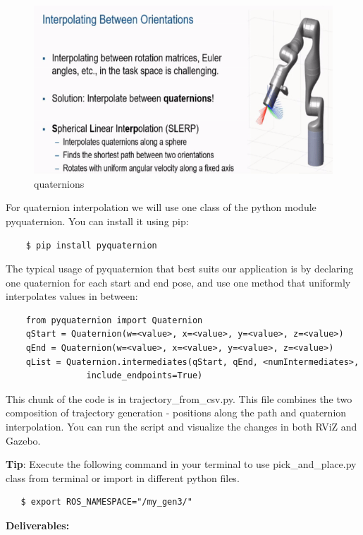 \documentclass[12pt]{article}
\begin{document}
\begin{figure}[H]
    \centering\includegraphics[width=12cm]{images/lab72.png}\vspace{-10pt}
    \caption{quaternions}\label{fig:curves}
    \end{figure}

For quaternion interpolation we will use one class of the python module pyquaternion. You can install it using pip:
\begin{verbatim}
    $ pip install pyquaternion
\end{verbatim}

The typical usage of pyquaternion that best suits our application is by declaring one quaternion for each start and end pose, and use one method that uniformly interpolates values in between:
\begin{verbatim}
    from pyquaternion import Quaternion
    qStart = Quaternion(w=<value>, x=<value>, y=<value>, z=<value>)
    qEnd = Quaternion(w=<value>, x=<value>, y=<value>, z=<value>)
    qList = Quaternion.intermediates(qStart, qEnd, <numIntermediates>, 
                include_endpoints=True)
\end{verbatim}

This chunk of the code is in trajectory\_from\_csv.py. This file combines the two composition of trajectory generation - positions along the path and quaternion interpolation. You can run the script and visualize the changes in both RViZ and Gazebo.

\textbf{Tip}: Execute the following command in your terminal to use pick\_and\_place.py class from terminal or import in different python files.
\begin{verbatim}
   $ export ROS_NAMESPACE="/my_gen3/"
\end{verbatim}

\textbf{Deliverables:}
\end{document}
